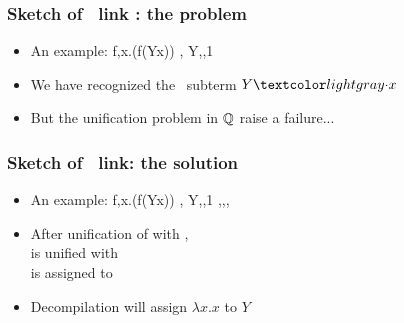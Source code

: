 \documentclass{pres}
\begin{document}
\begin{frame}[fragile]
  \frametitle{Sketch of \maybeeta\ link : the problem}

  \def\var{Y}

  \begin{itemize}
    \item An example: %
      \printAlllSingle
        {{{f,\lambda x.(f\appsep (\var\appsep x))}}}
        {{{,}}}
        {{{\var,,1}}}
        {{}}
    \item We have recognized the \maybebeta\ subterm $\var\appsep x$
    \item But the unification problem in $\mathbb{Q}$ raise a failure...
    \end{itemize}

\end{frame}

\begin{frame}[fragile]
  \frametitle{Sketch of \maybeeta\ link: the solution}

  \def\var{Y}

  \begin{itemize}
    \item An example: %
      \printAlllSingle
        {{{f,\lambda x.(f\appsep (\var\appsep x))}}}
        {{{,}}}
        {{{\var,,1}}}
        {{{\eta,,,}}}
    \item After unification of  with ,\\
           is unified with \\
           is assigned to 
    \item Decompilation will assign $\lambda x.x$ to $\var$
    \end{itemize}

\end{frame}
\end{document}
